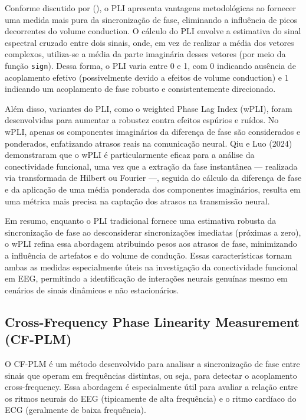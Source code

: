 Conforme discutido por \citeauthor{seraj2018cerebral} (\citeyear{seraj2018cerebral}), o PLI apresenta vantagens metodológicas ao fornecer uma medida mais pura da sincronização de fase, eliminando a influência de picos decorrentes do volume conduction. O cálculo do PLI envolve a estimativa do sinal espectral cruzado entre dois sinais, onde, em vez de realizar a média dos vetores complexos, utiliza-se a média da parte imaginária desses vetores (por meio da função \texttt{sign}). Dessa forma, o PLI varia entre 0 e 1, com 0 indicando ausência de acoplamento efetivo (possivelmente devido a efeitos de volume conduction) e 1 indicando um acoplamento de fase robusto e consistentemente direcionado.

Além disso, variantes do PLI, como o weighted Phase Lag Index (wPLI), foram desenvolvidas para aumentar a robustez contra efeitos espúrios e ruídos. No wPLI, apenas os componentes imaginários da diferença de fase são considerados e ponderados, enfatizando atrasos reais na comunicação neural. Qiu e Luo (2024) \cite{qiu2024brain} demonstraram que o wPLI é particularmente eficaz para a análise da conectividade funcional, uma vez que a extração da fase instantânea — realizada via transformada de Hilbert ou Fourier —, seguida do cálculo da diferença de fase e da aplicação de uma média ponderada dos componentes imaginários, resulta em uma métrica mais precisa na captação dos atrasos na transmissão neural.

Em resumo, enquanto o PLI tradicional fornece uma estimativa robusta da sincronização de fase ao desconsiderar sincronizações imediatas (próximas a zero), o wPLI refina essa abordagem atribuindo pesos aos atrasos de fase, minimizando a influência de artefatos e do volume de condução. Essas características tornam ambas as medidas especialmente úteis na investigação da conectividade funcional em EEG, permitindo a identificação de interações neurais genuínas mesmo em cenários de sinais dinâmicos e não estacionários.

\subsection{Cross-Frequency Phase Linearity Measurement (CF-PLM)}

O CF-PLM é um método desenvolvido para analisar a sincronização de fase entre sinais que operam em frequências distintas, ou seja, para detectar o acoplamento cross-frequency. Essa abordagem é especialmente útil para avaliar a relação entre os ritmos neurais do EEG (tipicamente de alta frequência) e o ritmo cardíaco do ECG (geralmente de baixa frequência).

